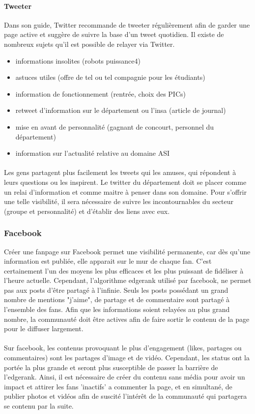 \paragraph{Tweeter ~~\\} 
Dans son guide, Twitter recommande de tweeter régulièrement afin de garder une page active et suggère de suivre la base d'un tweet quotidien.
Il existe de nombreux sujets qu'il est possible de relayer via Twitter.
\begin{itemize}
	\item informations insolites (robots puissance4)
	\item astuces utiles (offre de tel ou tel compagnie pour les étudiants)
	\item information de fonctionnement (rentrée, choix des PICs)
	\item retweet d'information sur le département ou l'insa (article de journal)
	\item mise en avant de personnalité (gagnant de concourt, personnel du département)
	\item information sur l'actualité relative au domaine ASI
\end{itemize}
\paragraph{}
 Les gens partagent plus facilement les tweets qui les amuses, qui répondent à leurs questions ou les inspirent. Le twitter du département doit se placer comme un relai d'information et comme maitre à penser dans son domaine. Pour s'offrir une telle visibilité, il sera nécessaire de suivre les incontournables du secteur (groupe et personnalité) et d'établir des liens avec eux.
\subsubsection{Facebook}
Créer une fanpage sur Facebook permet une visibilité permanente, car dès qu'une information est publiée, elle apparait sur le mur de chaque fan. C'est certainement l'un des moyens les plus efficaces et les plus puissant de fidéliser à l'heure actuelle. Cependant, l'algorithme edgerank utilisé par facebook, ne permet pas aux posts d'être partagé à l'infinie. Seuls les posts possédant un grand nombre de mentions "j'aime", de partage et de commentaire sont partagé à l'ensemble des fans. Afin que les informations soient relayées au plus grand nombre, la communauté doit être actives afin de faire sortir le contenu de la page pour le diffuser largement.
\paragraph{}
Sur facebook, les contenus provoquant le plus d'engagement (likes, partages ou commentaires) sont les partages d'image et de vidéo. Cependant, les status ont la portée la plus grande et seront plus susceptible de passer la barrière de l'edgerank. Ainsi, il est nécessaire de créer du contenu sans média pour avoir un impact et attirer les fans 'inactifs' a commenter la page, et en simultané, de publier photos et vidéos afin de suscité l'intérêt de la communauté qui partagera se contenu par la suite.